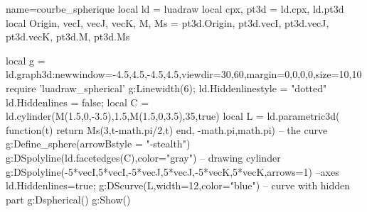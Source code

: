 \begin{luadraw}{name=courbe_spherique}
local ld = luadraw
local cpx, pt3d = ld.cpx, ld.pt3d
local Origin, vecI, vecJ, vecK, M, Ms = pt3d.Origin, pt3d.vecI, pt3d.vecJ, pt3d.vecK, pt3d.M, pt3d.Ms

local g = ld.graph3d:new{window={-4.5,4.5,-4.5,4.5},viewdir={30,60},margin={0,0,0,0},size={10,10}}
require 'luadraw_spherical'
g:Linewidth(6); ld.Hiddenlinestyle = "dotted"
ld.Hiddenlines = false; 
local C = ld.cylinder(M(1.5,0,-3.5),1.5,M(1.5,0,3.5),35,true)
local L = ld.parametric3d( function(t) return Ms(3,t-math.pi/2,t) end, -math.pi,math.pi) -- the curve
g:Define_sphere({arrowBstyle = "-stealth"})
g:DSpolyline(ld.facetedges(C),{color="gray"}) -- drawing cylinder
g:DSpolyline({{-5*vecI,5*vecI},{-5*vecJ,5*vecJ},{-5*vecK,5*vecK}},{arrows=1}) --axes
ld.Hiddenlines=true; g:DScurve(L,{width=12,color="blue"}) -- curve with hidden part
g:Dspherical()
g:Show()
\end{luadraw}
